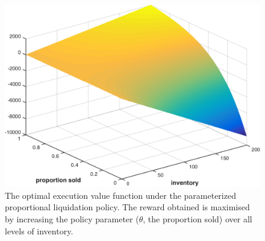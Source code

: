 \begin{figure}[h!]
    \centering
    \includegraphics[width=0.8\linewidth, height=0.5\linewidth]{images/opt_execution_fraction}
    \caption{The optimal execution value function under the parameterized proportional liquidation policy. The reward obtained is maximised by increasing the policy parameter ({\footnotesize $\theta $}, the proportion sold) over all levels of inventory.}
    \label{fig:opt_execution}            
\end{figure}
